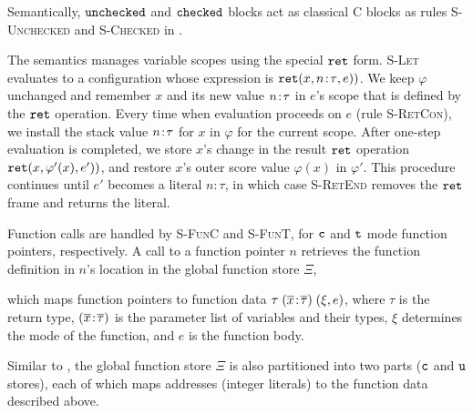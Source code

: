 %
Semantically, $\mathtt{unchecked}$ and $\mathtt{checked}$ blocks act as classical C blocks
as rules \textsc{S-Unchecked} and \textsc{S-Checked} in .


%
The semantics manages variable scopes using the special $\mathtt{ret}$
form. \textsc{S-Let} evaluates to a configuration whose expression is
$\mathtt{ret}({x},{{n}\!:\!{\tau}},{e}))$. We keep $\varphi$ unchanged
and remember $x$ and its new value ${n}\!:\!{\tau}$
in $e$'s scope that is defined by the $\mathtt{ret}$ operation.
Every time when evaluation proceeds on $e$ (rule \textsc{S-RetCon}),
we install the stack value ${n}\!:\!{\tau}$ for $x$ in $\varphi$ for the current scope.
After one-step evaluation is completed, 
we store $x$'s change in the result $\mathtt{ret}$ operation $\mathtt{ret}({x},{\varphi'(x)},{e'}))$,
and restore $x$'s outer score value $\varphi(x)$ in $\varphi'$. 
This procedure continues until $e'$ becomes a literal
$n\!:\!\tau$, in which case \textsc{S-RetEnd} removes the $\mathtt{ret}$ frame and returns
the literal. 

Function calls are handled by \textsc{S-FunC} and \textsc{S-FunT},
for $\texttt{c}$ and $\texttt{t}$ mode function pointers, respectively. 
A call to a function pointer $n$ retrieves
 the function definition in $n$'s location in the global function store $\Xi$,


% 
which maps function pointers to
function data $\tau\;({\overline{x}}\!:\!{\overline{\tau}})\;(\xi,e)$, where
$\tau$ is the return type, $({\overline{x}}\!:\!{\overline{\tau}})$
is the parameter list of variables and their types, 
$\xi$ determines the mode of the function, and $e$ is the
function body. 


Similar to \heap, the global function store $\Xi$ is also partitioned into
two parts ($\texttt{c}$ and $\texttt{u}$ stores), each of which
maps addresses (integer literals) to the function data described above.

